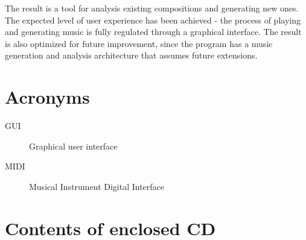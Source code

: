 \documentclass[thesis=B,english]{FITthesis}[2019/12/23]
\begin{document}
The result is a tool for analysis
existing compositions and generating new ones. The expected level of user experience has been achieved - the process of playing and generating music is fully regulated through a graphical interface. The result is also optimized for future improvement, since the program has a music generation and analysis architecture that assumes future extensions.




\appendix

\chapter{Acronyms}
\begin{description}
	\item[GUI] Graphical user interface
	\item[MIDI] Musical Instrument Digital Interface
\end{description}


\chapter{Contents of enclosed CD}


\begin{figure}
\end{figure}
\end{document}
